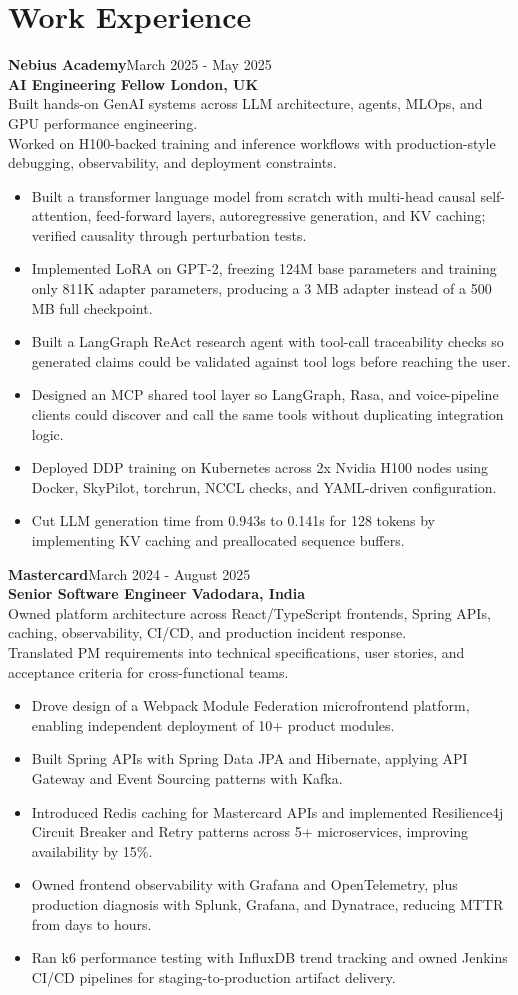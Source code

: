 \documentclass[10pt,a4paper]{article}
\newcommand{\resumeSubheading}[4]{%
  \textbf{#1}\hfill #2\\
  \textbf{#3}\hfill #4\\[-5pt]
}
\newcommand{\resumeItem}[1]{\item #1}
\newcommand{\resumeSummaryLine}[1]{#1\\}
\begin{document}
\section{Work Experience}
\resumeSubheading{Nebius Academy}{March 2025 - May 2025}{AI Engineering Fellow \textbar{} London, UK}{}
\resumeSummaryLine{Built hands-on GenAI systems across LLM architecture, agents, MLOps, and GPU performance engineering.}
\resumeSummaryLine{Worked on H100-backed training and inference workflows with production-style debugging, observability, and deployment constraints.}
\begin{itemize}
  \resumeItem{Built a transformer language model from scratch with multi-head causal self-attention, feed-forward layers, autoregressive generation, and KV caching; verified causality through perturbation tests.}
  \resumeItem{Implemented LoRA on GPT-2, freezing 124M base parameters and training only 811K adapter parameters, producing a 3 MB adapter instead of a 500 MB full checkpoint.}
  \resumeItem{Built a LangGraph ReAct research agent with tool-call traceability checks so generated claims could be validated against tool logs before reaching the user.}
  \resumeItem{Designed an MCP shared tool layer so LangGraph, Rasa, and voice-pipeline clients could discover and call the same tools without duplicating integration logic.}
  \resumeItem{Deployed DDP training on Kubernetes across 2x Nvidia H100 nodes using Docker, SkyPilot, torchrun, NCCL checks, and YAML-driven configuration.}
  \resumeItem{Cut LLM generation time from 0.943s to 0.141s for 128 tokens by implementing KV caching and preallocated sequence buffers.}
\end{itemize}

\resumeSubheading{Mastercard}{March 2024 - August 2025}{Senior Software Engineer \textbar{} Vadodara, India}{}
\resumeSummaryLine{Owned platform architecture across React/TypeScript frontends, Spring APIs, caching, observability, CI/CD, and production incident response.}
\resumeSummaryLine{Translated PM requirements into technical specifications, user stories, and acceptance criteria for cross-functional teams.}
\begin{itemize}
  \resumeItem{Drove design of a Webpack Module Federation microfrontend platform, enabling independent deployment of 10+ product modules.}
  \resumeItem{Built Spring APIs with Spring Data JPA and Hibernate, applying API Gateway and Event Sourcing patterns with Kafka.}
  \resumeItem{Introduced Redis caching for Mastercard APIs and implemented Resilience4j Circuit Breaker and Retry patterns across 5+ microservices, improving availability by 15\%.}
  \resumeItem{Owned frontend observability with Grafana and OpenTelemetry, plus production diagnosis with Splunk, Grafana, and Dynatrace, reducing MTTR from days to hours.}
  \resumeItem{Ran k6 performance testing with InfluxDB trend tracking and owned Jenkins CI/CD pipelines for staging-to-production artifact delivery.}
\end{itemize}
\end{document}
